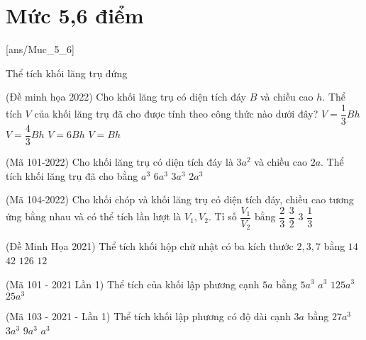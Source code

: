 \section{Mức 5,6 điểm}
[ans/Muc_5_6]
\setcounter{dang}{0}
\setcounter{ex}{0}
\begin{dang}
	{Thể tích khối lăng trụ đứng}
\end{dang}
\begin{ex}%
	(Đề minh họa 2022) Cho khối lăng trụ có diện tích đáy $B$ và chiều cao $h$. Thể tích $V$ của khối lăng trụ đã cho được tính theo công thức nào dưới đây?
	\choice
	{$V=\dfrac{1}{3}Bh$}
	{$V=\dfrac{4}{3}Bh$}
	{$V=6Bh$}
	{\True $V=Bh$}
\end{ex}
\begin{ex}%
	(Mã 101-2022) Cho khối lăng trụ có diện tích đáy là $3a^2$ và chiều cao $2a$. Thể tích khối lăng trụ đã cho bằng
	\choice
	{$a^3$}
	{\True $6a^3$}
	{$3a^3$}
	{$2a^3$}
\end{ex}
\begin{ex}%
	(Mã 104-2022) Cho khối chóp và khối lăng trụ có diện tích đáy, chiều cao tương ứng bằng nhau và có thể tích lần lượt là $V_1,V_2$. Tỉ số $\dfrac{V_1}{V_2}$ bằng
	\choice
	{$\dfrac{2}{3}$}
	{$\dfrac{3}{2}$}
	{$3$}
	{\True $\dfrac{1}{3}$}
\end{ex}
\begin{ex}%
	(Đề Minh Họa 2021) Thể tích khối hộp chữ nhật có ba kích thước $2, 3, 7$ bằng
	\choice
	{$14$}
	{$42$}
	{$126$}
	{$12$}
\end{ex}
\begin{ex}%
	(Mã 101 - 2021 Lần 1) Thể tích của khối lập phương cạnh $5a$ bằng
	\choice
	{$5a^3$}
	{$a^3$}
	{$125a^3$}
	{$25a^3$}
\end{ex}
\begin{ex}%
	(Mã 103 - 2021 - Lần 1) Thể tích khối lập phương có độ dài cạnh $3a$ bằng
	\choice
	{$27a^3$}
	{$3a^3$}
	{$9a^3$}
	{$a^3$}
\end{ex}
